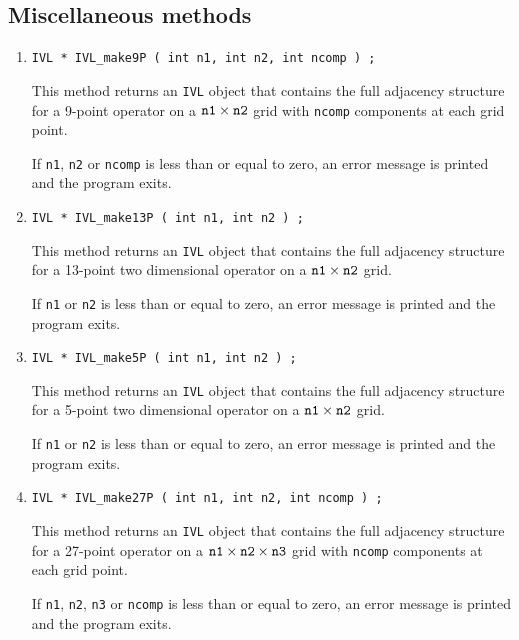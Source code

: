 \subsection{Miscellaneous methods}
\label{subsection:IVL:proto:miscellaneous}
\par
\begin{enumerate}
\item
\begin{verbatim}
IVL * IVL_make9P ( int n1, int n2, int ncomp ) ;
\end{verbatim}
This method returns an {\tt IVL} object that contains the full
adjacency structure for a 9-point operator on a 
${\tt n1} \times {\tt n2}$ grid with {\tt ncomp} components at each
grid point.
\par {}
If {\tt n1}, {\tt n2} or {\tt ncomp} is less than or equal to zero,
an error message is printed and the program exits.
\item
\begin{verbatim}
IVL * IVL_make13P ( int n1, int n2 ) ;
\end{verbatim}
This method returns an {\tt IVL} object that contains the full
adjacency structure for a 13-point two dimensional operator on a 
${\tt n1} \times {\tt n2}$ grid.
\par {}
If {\tt n1} or {\tt n2} is less than or equal to zero,
an error message is printed and the program exits.
\item
\begin{verbatim}
IVL * IVL_make5P ( int n1, int n2 ) ;
\end{verbatim}
This method returns an {\tt IVL} object that contains the full
adjacency structure for a 5-point two dimensional operator on a 
${\tt n1} \times {\tt n2}$ grid.
\par {}
If {\tt n1} or {\tt n2} is less than or equal to zero,
an error message is printed and the program exits.
\item
\begin{verbatim}
IVL * IVL_make27P ( int n1, int n2, int ncomp ) ;
\end{verbatim}
This method returns an {\tt IVL} object that contains the full
adjacency structure for a 27-point operator on a 
${\tt n1} \times {\tt n2} \times {\tt n3}$ grid 
with {\tt ncomp} components at each grid point.
\par {}
If {\tt n1}, {\tt n2}, {\tt n3} or {\tt ncomp} 
is less than or equal to zero,
an error message is printed and the program exits.
\end{enumerate}
\par
